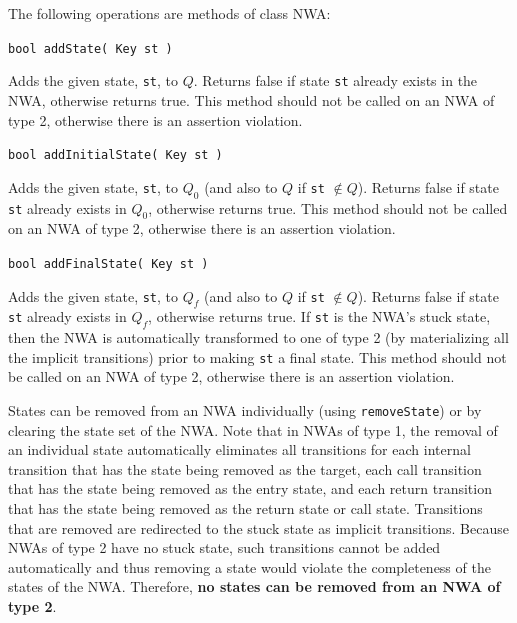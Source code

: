 \documentclass{llncs}
\begin{document}
\noindent The following operations are methods of class NWA:

\begin{description}

  \item\texttt{bool addState( Key st )} \nopagebreak

    Adds the given state, \texttt{st}, to $Q$.  Returns false if state \texttt{st} already exists in the NWA, otherwise returns true.  This method should not be called on an NWA of type 2, otherwise there is an assertion violation.

  \item\texttt{bool addInitialState( Key st )} \nopagebreak

    Adds the given state, \texttt{st}, to $Q_0 $ (and also to $Q$ if \texttt{st} $\not\in Q$).  Returns false if state \texttt{st} already exists in $Q_0$, otherwise returns true.  This method should not be called on an NWA of type 2, otherwise there is an assertion violation.

  \item\texttt{bool addFinalState( Key st )} \nopagebreak

    Adds the given state, \texttt{st}, to $Q_f$ (and also to $Q$ if \texttt{st} $\not\in Q$).  Returns false if state \texttt{st} already exists in $Q_f$, otherwise returns true.  If \texttt{st} is the NWA's stuck state, then the NWA is automatically transformed to one of type 2 (by materializing all the implicit transitions) prior to making \texttt{st} a final state.  This method should not be called on an NWA of type 2, otherwise there is an assertion violation. \\

\end{description}


States can be removed from an NWA individually (using \texttt{removeState}) or by clearing the state set of the NWA.  Note that in NWAs of type 1, the removal of an individual state automatically eliminates all transitions for each internal transition that has the state being removed as the target, each call transition that has the state being removed as the entry state, and each return transition that has the state being removed as the return state or call state.  Transitions that are removed are redirected to the stuck state as implicit transitions.  Because NWAs of type 2 have no stuck state, such transitions cannot be added automatically and thus removing a state would violate the completeness of the states of the NWA.  Therefore, \textbf{no states can be removed from an NWA of type 2}.  
\end{document}
